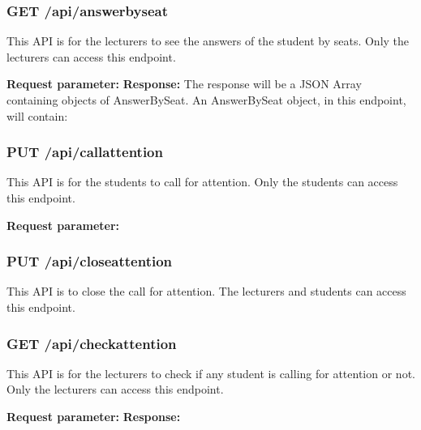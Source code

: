 \documentclass[a4paper, 11pt,openany]{book} %
\begin{document}
\subsubsection{GET /api/answerbyseat}
This API is for the lecturers to see the answers of the student by seats. Only the lecturers can access this endpoint. \par
\textbf{Request parameter:}
\textbf{Response:}
The response will be a JSON Array containing objects of AnswerBySeat. An AnswerBySeat object, in this endpoint, will contain:

\subsubsection{PUT /api/callattention}
This API is for the students to call for attention. Only the students can access this endpoint. \par
\textbf{Request parameter:}

\subsubsection{PUT /api/closeattention}
This API is to close the call for attention. The lecturers and students can access this endpoint. \par

\subsubsection{GET /api/checkattention}
This API is for the lecturers to check if any student is calling for attention or not. Only the lecturers can access this endpoint. \par
\textbf{Request parameter:}
\textbf{Response:}
\end{document}
